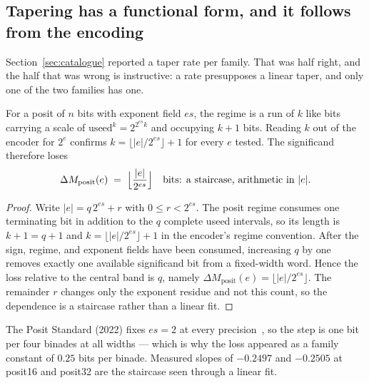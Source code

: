 \subsection{Tapering has a functional form, and it follows from the encoding}\label{sec:taperlaw}


Section~\ref{sec:catalogue} reported a taper rate per family. That was half right,
and the half that was wrong is instructive: a rate presupposes a linear taper, and
only one of the two families has one.

\begin{theorem}\label{thm:posit}
For a posit of $n$ bits with exponent field $es$, the regime is a run of $k$ like
bits carrying a scale of $\mathrm{useed}^k = 2^{2^{es}k}$ and occupying $k+1$ bits.
Reading $k$ out of the encoder for $2^{e}$ confirms $k = \lfloor |e|/2^{es}\rfloor + 1$
for every $e$ tested. The significand therefore loses
\[
  \Delta M_{\text{posit}}(e) \;=\; \Bigl\lfloor \frac{|e|}{2^{es}} \Bigr\rfloor
  \quad\text{bits: a staircase, arithmetic in } |e| .
\]
\end{theorem}
\begin{proof}
Write $|e|=q\,2^{es}+r$ with $0\le r<2^{es}$.
The posit regime consumes one terminating bit in addition to the $q$ complete
useed intervals, so its length is $k+1=q+1$ and
$k=\lfloor |e|/2^{es}\rfloor+1$ in the encoder's regime convention.
After the sign, regime, and exponent fields have been consumed, increasing
$q$ by one removes exactly one available significand bit from a fixed-width
word. Hence the loss relative to the central band is $q$, namely
$\Delta M_{\mathrm{posit}}(e)=\lfloor |e|/2^{es}\rfloor$.
The remainder $r$ changes only the exponent residue and not this count, so
the dependence is a staircase rather than a linear fit.
\end{proof}


The Posit Standard (2022) fixes $es = 2$ at every precision~\cite{gustafson}, so
the step is one bit per four binades at all widths --- which is why the loss
appeared as a family constant of $0.25$ bits per binade. Measured slopes of
$-0.2497$ and $-0.2505$ at posit16 and posit32 are the staircase seen through a
linear fit.

